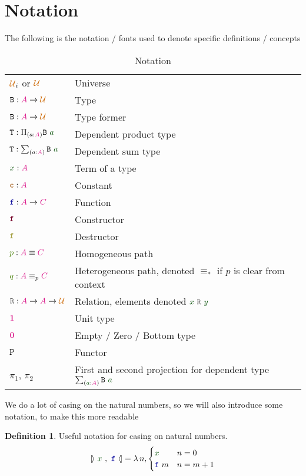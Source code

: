 \documentclass[twoside,11pt,openright]{report}
\theoremstyle{plain} %
\theoremstyle{definition}
\newtheorem{defn}[thm]{Definition}%
\theoremstyle{remark}
\newcommand*{\term}[1]{\textcolor{green!30!black}{#1}} %
\newcommand*{\pathterm}[1]{\textcolor{green!65!red!75!black}{#1}}
\newcommand*{\type}[1]{\textcolor{magenta!90!black}{#1}}
\newcommand*{\universe}[1]{\textcolor{orange!80!black}{#1}}
\newcommand*{\unit}{\type{\textbf{1}}}
\newcommand*{\empt}{\type{\textbf{0}}}
\newcommand*{\relation}[1]{\textcolor{gray!75!black}{\ensuremath{\mathtt{#1}}}}
\newcommand*{\constant}[1]{\textcolor{orange!60!black}{\ensuremath{\mathtt{#1}}}}
\newcommand*{\function}[1]{\textcolor{blue!60!black}{\ensuremath{\mathtt{#1}}}}
\newcommand*{\constructor}[1]{\textcolor{purple!60!black}{\ensuremath{\mathtt{#1}}}}
\newcommand*{\destructor}[1]{\textcolor{yellow!60!black}{\ensuremath{\mathtt{#1}}}}
\newcommand*{\typeformer}[1]{\ensuremath{\mathtt{#1}}}
\newcommand*{\functor}[1]{\ensuremath{\mathbf{\mathtt{#1}}}}
\newcommand*{\natcases}[2]{\ensuremath{\mathbb{[\hspace{-.5mm}\rangle}~\ensuremath{#1}~,~\ensuremath{#2}~\mathbb{\langle\hspace{-.5mm}]}}}
\begin{document}
\section{Notation}
The following is the notation / fonts used to denote specific definitions / concepts
\begin{table}[h]
  \begin{tabular}[h]{ll}
    \(\universe{\mathcal{U}}_i\) or \(\universe{\mathcal{U}}\) & Universe \\
    \(\typeformer{B} : \type{A} \rightarrow \universe{\mathcal{U}}\) & Type \\
    \(\typeformer{B} : \type{A} \rightarrow \universe{\mathcal{U}}\) & Type former \\
    \(\typeformer{T} : \Pi_{(a : \type{A})} \typeformer{B}~\term{a}\) & Dependent product type \\
    \(\typeformer{T} : \sum_{(a : \type{A})} \typeformer{B}~\term{a}\) & Dependent sum type \\
    \(\term{x} : \type{A}\) & Term of a type \\
    \(\constant{c} : \type{A}\) & Constant \\
    \(\function{f} : \type{A} \rightarrow \type{C}\) & Function \\
    \(\constructor{f}\) & Constructor \\
    \(\destructor{f}\) & Destructor \\
    \(\pathterm{p} : \type{A} \equiv \type{C}\) & Homogeneous path \\
    \(\pathterm{q} : \type{A} \equiv_{p} \type{C}\) & Heterogeneous path, denoted \(\equiv_{*}\) if \(p\) is clear from context \\
    \(\relation{R} : \type{A} \rightarrow \type{A} \rightarrow \universe{\mathcal{U}}\) & Relation, elements denoted \(\term{x}~\relation{R}~\term{y}\)\\
    \(\unit\) & Unit type \\
    \(\empt\) & Empty / Zero / Bottom type \\
    \(\functor{P}\) & Functor \\
    \(\pi_1\), \(\pi_2\) &  First and second projection for dependent type \(\sum_{(\term{a} : \type{A})} \typeformer{B}~\term{a}\)
  \end{tabular}
  \caption{Notation}
\end{table}
We do a lot of casing on the natural numbers, so we will also introduce some notation, to make this more readable
\begin{defn}
  Useful notation for casing on natural numbers.
  \begin{equation}
    \natcases{\term{x}}{\function{f}} = \lambda\,n, \begin{cases} \term{x} & n = 0 \\ \function{f}~m & n = m + 1 \end{cases}
  \end{equation}
\end{defn}
\end{document}
